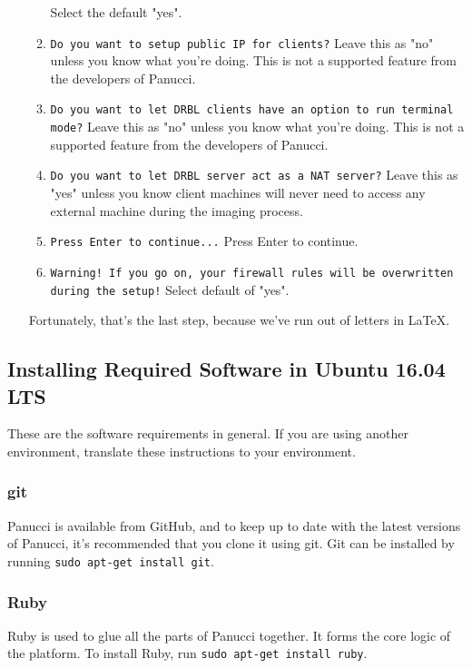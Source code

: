 \documentclass{article}
\def\code#1{\texttt{#1}}
\begin{document}
\begin{flushleft}
\begin{enumerate}
\begin{enumerate}
    Select the default "yes".
    \item \code{Do you want to setup public IP for clients?}\linebreak\linebreak
    Leave this as "no" unless you know what you're doing.  This is not a supported feature from the developers of Panucci.
    \item \code{Do you want to let DRBL clients have an option to run terminal mode?}\linebreak\linebreak
    Leave this as "no" unless you know what you're doing.  This is not a supported feature from the developers of Panucci.
    \item \code{Do you want to let DRBL server act as a NAT server?}\linebreak\linebreak
    Leave this as "yes" unless you know client machines will never need to access any external machine during the imaging process.
    \item \code{Press Enter to continue...}\linebreak\linebreak
    Press Enter to continue.
    \item \code{Warning!  If you go on, your firewall rules will be overwritten during the setup!}\linebreak\linebreak
    Select default of "yes".
  \end{enumerate}
  Fortunately, that's the last step, because we've run out of letters in LaTeX.
\end{enumerate}
\subsection{Installing Required Software in Ubuntu 16.04 LTS}
These are the software requirements in general.  If you are using another environment, translate these instructions to your environment.
\subsubsection{git}
Panucci is available from GitHub, and to keep up to date with the latest versions of Panucci, it's recommended that you clone it using git.  Git can be installed by running \code{sudo apt-get install git}.
\subsubsection{Ruby}
Ruby is used to glue all the parts of Panucci together.  It forms the core logic of the platform.  To install Ruby, run \code{sudo apt-get install ruby}.

\end{flushleft}
\end{document}

